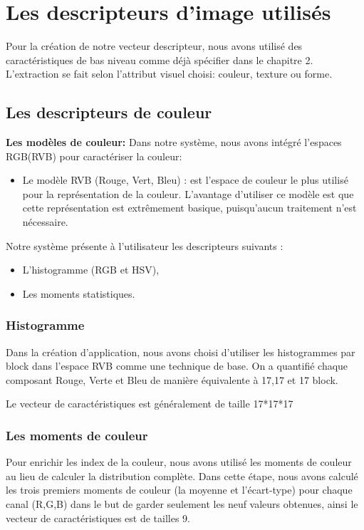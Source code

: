 \section{Les descripteurs d’image utilisés}
Pour la création de notre vecteur descripteur, nous avons utilisé des
caractéristiques de bas niveau comme déjà spécifier dans le chapitre 2. L'extraction se fait selon l'attribut visuel choisi: couleur, texture ou forme.
\subsection{Les descripteurs de couleur}
\textbf{Les modèles de couleur: }
Dans notre système, nous avons intégré l'espaces RGB(RVB) pour caractériser la couleur:\\

\begin{itemize}
	\item Le modèle RVB (Rouge, Vert, Bleu) : est l’espace de couleur le plus utilisé pour la représentation de la couleur. L’avantage d’utiliser ce modèle est que cette représentation est extrêmement basique, puisqu’aucun traitement n’est nécessaire.
\end{itemize}

Notre système présente à l'utilisateur les descripteurs suivants :
\begin{itemize}
	\item L'histogramme (RGB et HSV),
	\item Les moments statistiques.
\end{itemize}

\subsubsection{Histogramme}
Dans la création d’application, nous avons choisi d’utiliser les histogrammes par block dans l’espace RVB comme une technique de base.
On a quantifié chaque composant Rouge, Verte et Bleu de manière
équivalente à 17,17 et 17 block.

Le vecteur de caractéristiques est généralement de taille 17*17*17
\subsubsection{Les moments de couleur}
Pour enrichir les index de la couleur, nous avons utilisé les moments de
couleur au lieu de calculer la distribution complète. Dans cette étape, nous avons calculé les trois premiers moments de couleur (la moyenne et l’écart-type) pour chaque canal (R,G,B) dans le but de garder seulement les neuf valeurs obtenues, ainsi le vecteur de caractéristiques est de tailles 9.

